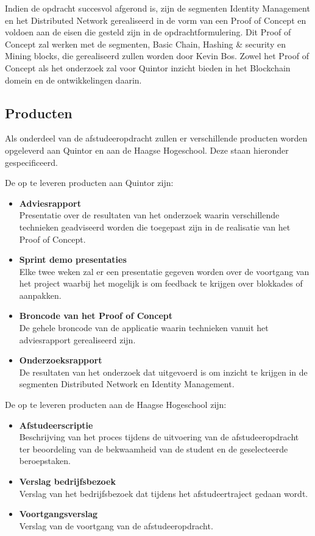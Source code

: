 Indien de opdracht succesvol afgerond is, zijn de segmenten Identity Management en het Distributed Network gerealiseerd in de vorm van een Proof of Concept en voldoen aan de eisen die gesteld zijn in de opdrachtformulering. Dit Proof of Concept zal werken met de segmenten, Basic Chain, Hashing \& security en Mining blocks, die gerealiseerd zullen worden door Kevin Bos. Zowel het Proof of Concept als het onderzoek zal voor Quintor inzicht bieden in het Blockchain domein en de ontwikkelingen daarin.

\subsection{Producten}

Als onderdeel van de afstudeeropdracht zullen er verschillende producten worden opgeleverd aan Quintor en aan de Haagse Hogeschool. Deze staan hieronder gespecificeerd.

De op te leveren producten aan Quintor zijn:
\begin{itemize}
  \item{\textbf{Adviesrapport}}
  \\ Presentatie over de resultaten van het onderzoek waarin verschillende technieken geadviseerd worden die toegepast zijn in de realisatie van het Proof of Concept.
  \item{\textbf{Sprint demo presentaties}}
  \\ Elke twee weken zal er een presentatie gegeven worden over de voortgang van het project waarbij het mogelijk is om feedback te krijgen over blokkades of aanpakken.
  \item{\textbf{Broncode van het Proof of Concept}}
  \\ De gehele broncode van de applicatie waarin technieken vanuit het adviesrapport gerealiseerd zijn.
  \item{\textbf{Onderzoeksrapport}}
  \\ De resultaten van het onderzoek dat uitgevoerd is om inzicht te krijgen in de segmenten Distributed Network en Identity Management.
\end{itemize}

\newpage
De op te leveren producten aan de Haagse Hogeschool zijn:
\begin{itemize}
  \item{\textbf{Afstudeerscriptie}}
  \\ Beschrijving van het proces tijdens de uitvoering van de afstudeeropdracht ter beoordeling van de bekwaamheid van de student en de geselecteerde beroepstaken.
  \item{\textbf{Verslag bedrijfsbezoek}}
  \\ Verslag van het bedrijfsbezoek dat tijdens het afstudeertraject gedaan wordt.
  \item{\textbf{Voortgangsverslag}}
  \\ Verslag van de voortgang van de afstudeeropdracht.
\end{itemize}


